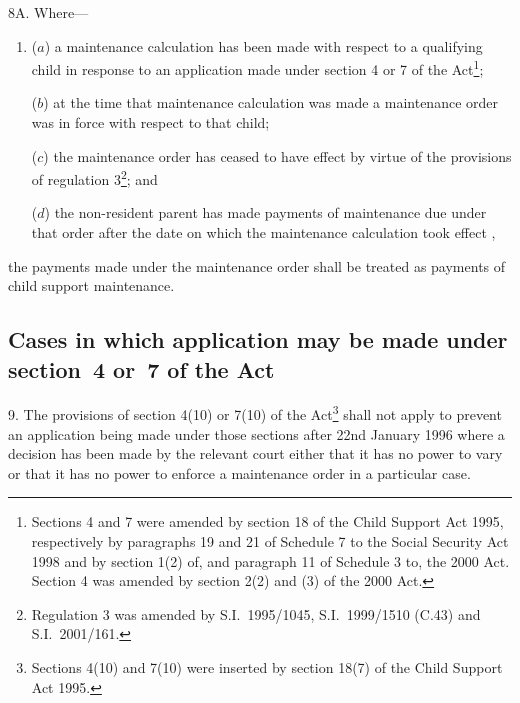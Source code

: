 \documentclass[12pt,a4paper]{article}
\begin{document}
8A.  Where—
\begin{enumerate}\item[]
($a$) a maintenance calculation has been made with respect to a qualifying child in response to an application made under section 4 or 7 of the Act\footnote{Sections 4 and 7 were amended by section 18 of the Child Support Act 1995, respectively by paragraphs 19 and 21 of Schedule 7 to the Social Security Act 1998 and by section 1(2) of, and paragraph 11 of Schedule 3 to, the 2000 Act. Section 4 was amended by section 2(2) and (3) of the 2000 Act.};

($b$) at the time that maintenance calculation was made a maintenance order was in force with respect to that child;

($c$) the maintenance order has ceased to have effect by virtue of the provisions of regulation 3\footnote{Regulation 3 was amended by S.I.\ 1995/1045, S.I.\ 1999/1510 (C.43) and S.I.\ 2001/161.}; and

($d$) the non-resident parent has made payments of maintenance due under that order after the date on which the maintenance calculation took effect%
,
\end{enumerate}
the payments made under the maintenance order shall be treated as payments of child support maintenance.


\subsection[9. Cases in which application may be made under section 4 or 7 of the Act]{Cases in which application may be made under section~4 or~7 of the Act}

9.  The provisions of section 4(10) or 7(10) of the Act\footnote{\frenchspacing Sections 4(10) and 7(10) were inserted by section 18(7) of the Child Support Act 1995.} shall not apply to prevent an application being made under those sections after 22nd January 1996 where a decision has been made by the relevant court either that it has no power to vary or that it has no power to enforce a maintenance order in a particular case.
\end{document}
